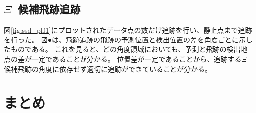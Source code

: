\documentclass[12pt,a4paper]{jarticle}
\begin{document}
\newpage
\subsection{$\Xi$$^-$候補飛跡追跡}
図\ref{fig:ssd_pl01}にプロットされたデータ点の数だけ追跡を行い、静止点まで追跡を行った。
図●は、飛跡追跡の飛跡の予測位置と検出位置の差を角度ごとに示したものである。
これを見ると、どの角度領域においても、予測と飛跡の検出地点の差が一定であることが分かる。
位置差が一定であることから、追跡する$\Xi$$^-$候補飛跡の角度に依存せず適切に追跡ができていることが分かる。
\par


\newpage
\section{まとめ}
\end{document}
